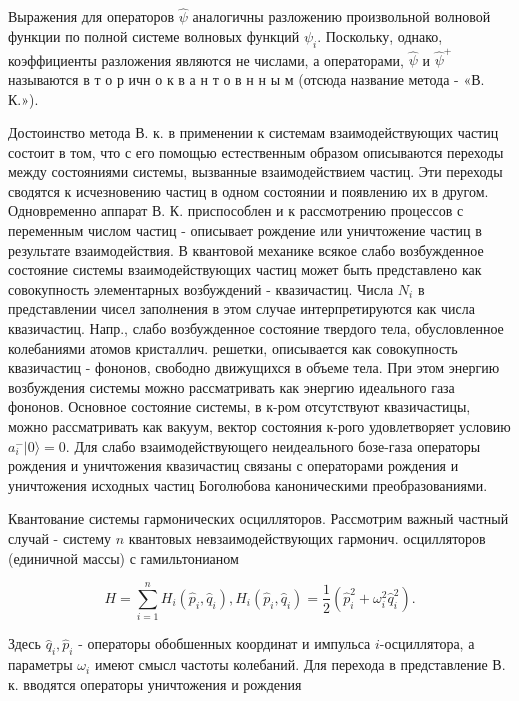 \documentclass[10pt]{article}
\begin{document}
Выражения для операторов $\hat{\psi}$ аналогичны разложению произвольной волновой функции по полной системе волновых функций $\psi_{i}$. Поскольку, однако, коэффициенты разложения являются не числами, а операторами, $\hat{\psi}$ и $\hat{\psi}^{+}$называются в т о р ичн о к в а н т о в н н ы м (отсюда название метода - «В. К.»).



Достоинство метода В. к. в применении к системам взаимодействующих частиц состоит в том, что с его помощью естественным образом описываются переходы между состояниями системы, вызванные взаимодействием частиц. Эти переходы сводятся к исчезновению частиц в одном состоянии и появлению их в другом. Одновременно аппарат В. К. приспособлен и к рассмотрению процессов с переменным числом частиц - описывает рождение или уничтожение частиц в результате взаимодействия. В квантовой механике всякое слабо возбужденное состояние системы взаимодействующих частиц может быть представлено как совокупность элементарных возбуждений - квазичастиц. Числа $N_{i}$ в представлении чисел заполнения в этом случае интерпретируются как числа квазичастиц. Напр., слабо возбужденное состояние твердого тела, обусловленное колебаниями атомов кристаллич. решетки, описывается как совокупность квазичастиц - фононов, свободно движущихся в объеме тела. При этом энергию возбуждения системы можно рассматривать как энергию идеального газа фононов. Основное состояние системы, в к-ром отсутствуют квазичастицы, можно рассматривать как вакуум, вектор состояния к-рого удовлетворяет условию $a_{i}^{-}|0\rangle=0$. Для слабо взаимодействующего неидеального бозе-газа операторы рождения и уничтожения квазичастиц связаны с операторами рождения и уничтожения исходных частиц Боголюбова каноническими преобразованиями.



Квантование системы гармонических осцилляторов. Рассмотрим важный частный случай - систему $n$ квантовых невзаимодействующих гармонич. осцилляторов (единичной массы) с гамильтонианом



\[

H=\sum_{i=1}^{n} H_{i}\left(\hat{p}_{i}, \hat{q}_{i}\right), H_{i}\left(\hat{p}_{i}, \hat{q}_{i}\right)=\frac{1}{2}\left(\hat{p}_{i}^{2}+\omega_{i}^{2} \hat{q}_{i}^{2}\right) .

\]



Здесь $\hat{q}_{i}, \hat{p}_{i}$ - операторы обобшенных координат и импульса $i$-осциллятора, а параметры $\omega_{i}$ имеют смысл частоты колебаний. Для перехода в представление В. к. вводятся операторы уничтожения и рождения
\end{document}
